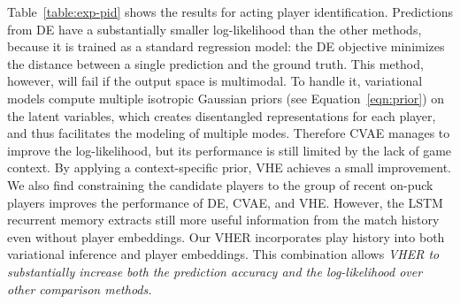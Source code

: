 \documentclass{article}
\begin{document}
Table~\ref{table:exp-pid} shows the  results for acting player identification. Predictions from DE have a substantially smaller log-likelihood than the other methods, because it is trained as a standard regression model: the DE objective minimizes the distance between a single prediction and the ground truth. This method, however, will fail if the output space is multimodal.
To handle it, variational models compute multiple isotropic Gaussian priors (see Equation~\eqref{eqn:prior}) on the latent variables, which creates disentangled representations for each player, and thus facilitates the modeling of multiple modes.
Therefore CVAE manages to improve the log-likelihood, but its performance is still limited by the lack of game context. By applying a context-specific prior, VHE achieves a small improvement. 
We also find constraining the candidate players to the group of recent on-puck players improves the performance of DE, CVAE, and VHE. However, the LSTM recurrent memory extracts still more useful information from the match history even without player embeddings. 
Our VHER incorporates play history into both variational inference and player embeddings. This combination allows
{\em VHER to substantially increase both the prediction accuracy and the log-likelihood over other comparison methods.}
\end{document}
